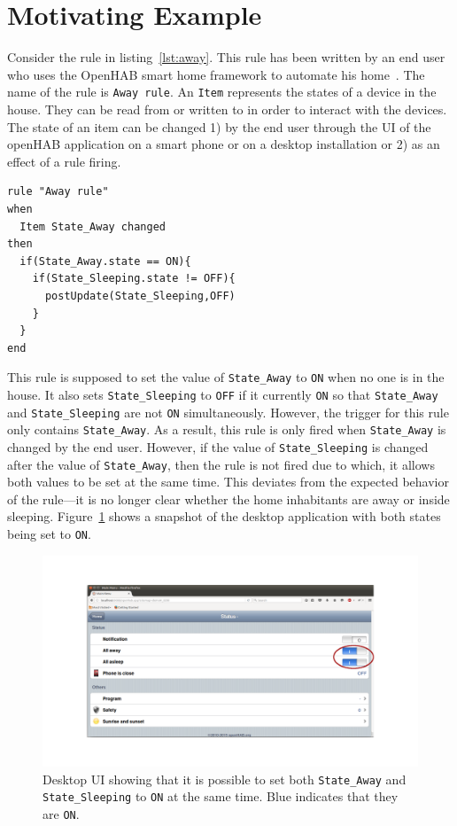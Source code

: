 \documentclass{sig-alternate-05-2015}
\begin{document}
\section{Motivating Example}
\label{sec:motivation}
Consider the rule in listing~\ref{lst:away}. This rule has been written by an end user who uses the OpenHAB smart home framework to automate his home~\cite{data1}. The name of the rule is \texttt{Away rule}. An \texttt{Item} represents the states of a device in the house. They can be read from or written to in order to interact with the devices. The state of an item can be changed 1) by the end user through the UI of the openHAB application on a smart phone or on a desktop installation or 2) as an effect of a rule firing.
\begin{lstlisting}[caption={Rule for setting the Away or Sleeping state.},label={lst:away}]
rule "Away rule"
when
  Item State_Away changed 	
then
  if(State_Away.state == ON){
    if(State_Sleeping.state != OFF){
      postUpdate(State_Sleeping,OFF)
    }
  }
end
\end{lstlisting}
This rule is supposed to set the value of \texttt{State\_Away} to \texttt{ON} when no one is in the house. It also sets \texttt{State\_Sleeping} to \texttt{OFF} if it currently \texttt{ON} so that  \texttt{State\_Away} and \texttt{State\_Sleeping} are not \texttt{ON} simultaneously. However, the trigger for this rule only contains \texttt{State\_Away}. As a result, this rule is only fired when \texttt{State\_Away} is changed by the end user. However, if the value of \texttt{State\_Sleeping} is changed after the value of \texttt{State\_Away}, then the rule is not fired due to which, it allows both values to be set at the same time. This deviates from the expected behavior of the rule---it is no longer clear whether the home inhabitants are away or inside sleeping.  Figure~\ref{fig:awayrule} shows a snapshot of the desktop application with both states being set to \texttt{ON}. 
\begin{figure}
\centering
\includegraphics [trim=4cm 5cm 0 5cm, scale=0.14]{images/openhab-runtime.png}
\caption{Desktop UI showing that it is possible to set both \texttt{State\_Away} and \texttt{State\_Sleeping} to \texttt{ON} at the same time. Blue indicates that they are \texttt{ON}.}
\label{fig:awayrule}
\end{figure}
\end{document}
